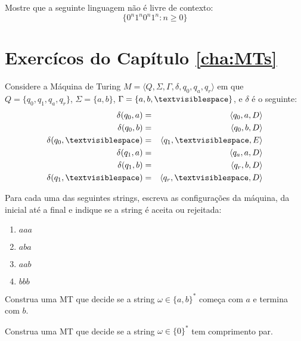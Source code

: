 \begin{exercicio}
  Mostre que a seguinte linguagem não é livre de contexto:
  \begin{displaymath}
    \{0^n1^n0^n1^n : n \geq 0\}
  \end{displaymath}

\end{exercicio}

\newpage

\section{Exercícos do Capítulo \ref{cha:MTs}}
\label{sec:ex-mts}

\begin{exercicio}
Considere a Máquina de Turing $M = \langle Q, \Sigma, \Gamma, \delta, q_0, q_a, q_r \rangle$ em que $Q = \{q_0, q_1, q_a, q_r\}$, $\Sigma = \{a,b\}$, $\Gamma = \{a,b, \textvisiblespace\}$, e $\delta$ é o seguinte:
  \begin{eqnarray*}
    \delta(q_0, a) & = & \langle q_0, a, D \rangle \\ 
    \delta(q_0, b) & = & \langle q_0, b, D\rangle \\
    \delta(q_0, \textvisiblespace) & = & \langle q_1, \textvisiblespace, E\rangle \\
    \delta(q_1, a) & = & \langle q_a, a, D\rangle \\
    \delta(q_1, b) & = & \langle q_r, b, D\rangle \\
    \delta(q_1, \textvisiblespace) & = & \langle q_r, \textvisiblespace, D\rangle \\
  \end{eqnarray*}

Para cada uma das seguintes strings, escreva as configurações da máquina, da inicial até a final e indique se a string é aceita ou rejeitada:

\begin{enumerate}
\item $aaa$
\item $aba$
\item $aab$
\item $bbb$
\end{enumerate}
\end{exercicio}

\begin{exercicio}
Construa uma MT que decide se a string $\omega \in \{a,b\}^*$ começa com $a$ e termina com $b$.
\end{exercicio}

\begin{exercicio}
Construa uma MT que decide se a string $\omega \in \{0\}^*$ tem comprimento par.
\end{exercicio}

\newpage



